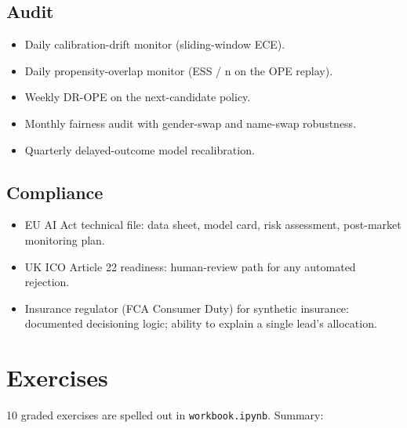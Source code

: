 \documentclass[11pt,oneside]{scrbook}
\begin{document}
\section{Audit}

\begin{itemize}\setlength\itemsep{0pt}
  \item Daily calibration-drift monitor (sliding-window ECE).
  \item Daily propensity-overlap monitor (ESS / n on the OPE replay).
  \item Weekly DR-OPE on the next-candidate policy.
  \item Monthly fairness audit with gender-swap and name-swap robustness.
  \item Quarterly delayed-outcome model recalibration.
\end{itemize}

\section{Compliance}

\begin{itemize}\setlength\itemsep{0pt}
  \item EU AI Act technical file: data sheet, model card, risk assessment,
        post-market monitoring plan.
  \item UK ICO Article 22 readiness: human-review path for any automated
        rejection.
  \item Insurance regulator (FCA Consumer Duty) for synthetic insurance: documented
        decisioning logic; ability to explain a single lead's allocation.
\end{itemize}

\chapter{Exercises}

10 graded exercises are spelled out in \texttt{workbook.ipynb}. Summary:
\end{document}
